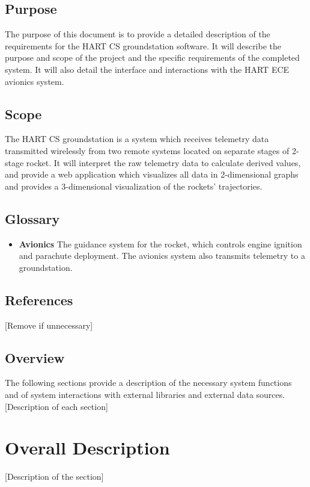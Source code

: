 \documentclass[onecolumn, draftclsnofoot,10pt, compsoc]{IEEEtran}
\begin{document}
		\subsection{Purpose}
			The purpose of this document is to provide a detailed description of the requirements for the HART CS groundstation software. 
			It will describe the purpose and scope of the project and the specific requirements of the completed system. 
			It will also detail the interface and interactions with the HART ECE avionics system.

		\subsection{Scope}
			The HART CS groundstation is a system which receives telemetry data transmitted wirelessly from two remote systems located on separate stages of 2-stage rocket. 
			It will interpret the raw telemetry data to calculate derived values, and provide a web application which visualizes all data in 2-dimensional graphs and provides a 3-dimensional visualization of the rockets' trajectories.

		\subsection{Glossary}
			\begin{itemize}
				\item \textbf{Avionics}
					The guidance system for the rocket, which controls engine ignition and parachute deployment.
					The avionics system also transmits telemetry to a groundstation.

			\end{itemize}

		\subsection{References}
			[Remove if unnecessary]

		\subsection{Overview}
			The following sections provide a description of the necessary system functions and of system interactions with external libraries and external data sources.
			[Description of each section]


	\newpage
	\section{Overall Description}
		[Description of the section]
\end{document}
